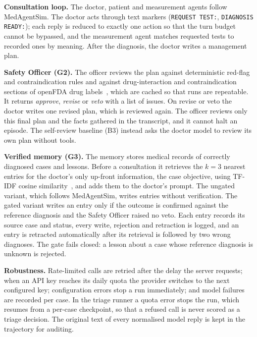\documentclass[conference]{IEEEtran}
\begin{document}
\textbf{Consultation loop.} The doctor, patient and measurement agents follow MedAgentSim. The
doctor acts through text markers (\texttt{REQUEST TEST:}, \texttt{DIAGNOSIS READY:}); each reply is
reduced to exactly one action so that the turn budget cannot be bypassed, and the measurement
agent matches requested tests to recorded ones by meaning. After the diagnosis, the doctor writes
a management plan.

\textbf{Safety Officer (G2).} The officer reviews the plan against deterministic red-flag and
contraindication rules and against drug-interaction and contraindication sections of openFDA drug
labels~\cite{kasshout2016openfda}, which are cached so that runs are repeatable. It returns
\emph{approve}, \emph{revise} or \emph{veto} with a list of issues. On revise or veto the doctor
writes one revised plan, which is reviewed again. The officer reviews only this final plan and the
facts gathered in the transcript, and it cannot halt an episode. The self-review baseline (B3) instead asks the doctor model to review its own
plan without tools.

\textbf{Verified memory (G3).} The memory stores medical records of correctly diagnosed cases and
lessons. Before a consultation it retrieves the $k=3$ nearest entries for the doctor's only
up-front information, the case objective, using TF-IDF cosine similarity~\cite{salton1988tfidf},
and adds them to the doctor's prompt. The ungated variant, which follows MedAgentSim, writes
entries without verification. The gated variant writes an entry only if the outcome is confirmed
against the reference diagnosis and the Safety Officer raised no veto. Each entry records its
source case and status, every write, rejection and retraction is logged, and an entry is
retracted automatically after its retrieval is followed by two wrong diagnoses. The gate fails
closed: a lesson about a case whose reference diagnosis is unknown is rejected.

\textbf{Robustness.} Rate-limited calls are retried after the delay the server requests; when an
API key reaches its daily quota the provider switches to the next configured key; configuration
errors stop a run immediately; and model failures are recorded per case. In the triage runner a
quota error stops the run, which resumes from a per-case checkpoint, so that a refused call is
never scored as a triage decision.
The original text of every normalised model reply is kept in the trajectory for auditing.

\end{document}
